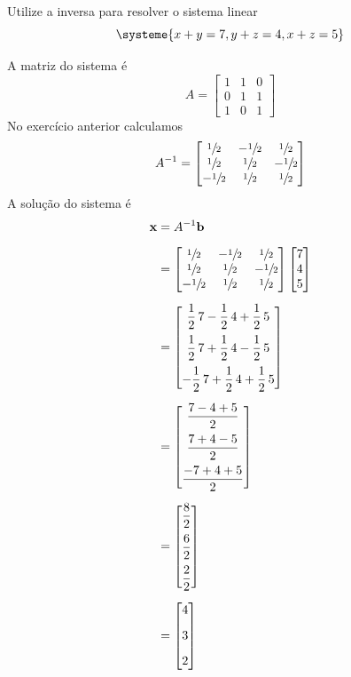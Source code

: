 \documentclass[a4paper,12pt,fleqn]{article}
\begin{document}
Utilize a inversa para resolver o sistema linear
\[
  \systeme{
  x + y = 7,
  y + z = 4,
  x + z = 5
  }
\]

\begin{answer}
A matriz do sistema é
\[
  A =
  \begin{bmatrix}
    1 & 1 & 0 \\
    0 & 1 & 1 \\
    1 & 0 & 1
  \end{bmatrix}
\]
No exercício anterior calculamos
\[
  A^{-1} =
  \begin{bmatrix}
    \sfrac{1}{2}  & -\sfrac{1}{2} & \sfrac{1}{2}  \\
    \sfrac{1}{2}  & \sfrac{1}{2}  & -\sfrac{1}{2} \\
    -\sfrac{1}{2} & \sfrac{1}{2}  & \sfrac{1}{2}
  \end{bmatrix}
\]
A solução do sistema é
\begin{align*}
  \mathbf{x}
  & = A^{-1} \mathbf{b}
  \\[2mm]
  & =
    \begin{bmatrix}
      \sfrac{1}{2}  & -\sfrac{1}{2} & \sfrac{1}{2}  \\
      \sfrac{1}{2}  & \sfrac{1}{2}  & -\sfrac{1}{2} \\
      -\sfrac{1}{2} & \sfrac{1}{2}  & \sfrac{1}{2}
    \end{bmatrix}
    \begin{bmatrix}
      7 \\
      4 \\
      5 \\
    \end{bmatrix}
  \\[2mm]
  & =
    \begin{bmatrix}
       \dfrac{1}{2}\, 7 - \dfrac{1}{2}\, 4 + \dfrac{1}{2}\, 5 \\[3mm]
       \dfrac{1}{2}\, 7 + \dfrac{1}{2}\, 4 - \dfrac{1}{2}\, 5 \\[3mm]
      -\dfrac{1}{2}\, 7 + \dfrac{1}{2}\, 4 + \dfrac{1}{2}\, 5
    \end{bmatrix}
  \\[2mm]
  & =
    \begin{bmatrix}
      \dfrac{ 7 - 4 + 5}{2} \\[3mm]
      \dfrac{ 7 + 4 - 5}{2} \\[3mm]
      \dfrac{-7 + 4 + 5}{2}
    \end{bmatrix}
  \\[2mm]
  & =
    \begin{bmatrix}
      \dfrac{8}{2} \\[3mm]
      \dfrac{6}{2} \\[3mm]
      \dfrac{2}{2}
    \end{bmatrix}
  \\[2mm]
  & =
    \begin{bmatrix}
      4 \\[3mm]
      3 \\[3mm]
      2
    \end{bmatrix}
\end{align*}
\end{answer}

\end{document}
